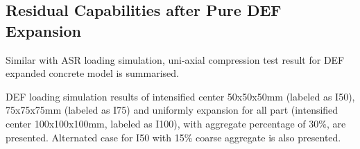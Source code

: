 \clearpage

\subsection{Residual Capabilities after Pure DEF Expansion}

Similar with ASR loading simulation, uni-axial compression test result for DEF expanded concrete model is summarised.

DEF loading simulation results of intensified center 50x50x50mm (labeled as I50), 75x75x75mm (labeled as I75) and uniformly expansion for all part (intensified center 100x100x100mm, labeled as I100), with aggregate percentage of 30\%, are presented.  Alternated case for I50 with 15\% coarse aggregate is also presented.

